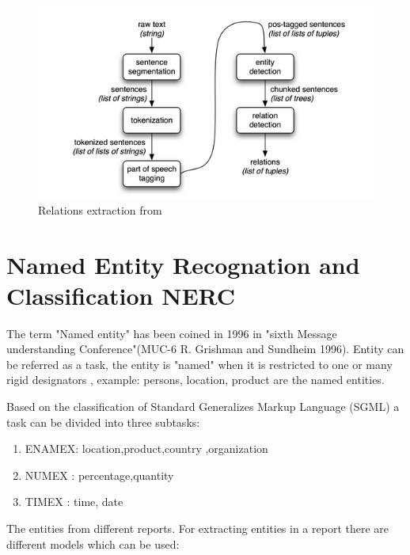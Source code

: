 \begin{figure}[hbtp]
\caption{Relations extraction from }
\centering
\includegraphics[scale=0.7]{images/nltk.png}
\end{figure}



\section{ Named Entity Recognation and Classification  NERC}
The term "Named entity" has been coined in 1996 in "sixth  Message understanding Conference"(MUC-6  R. Grishman and  Sundheim 1996).
Entity can be referred as a task, the entity is "named" when it is restricted to one or many rigid designators \citep{sharnagat2014named}, example: persons, location, product are the named entities.

Based on the classification of Standard Generalizes Markup Language (SGML) a task can be divided into three subtasks:
\begin{enumerate}
\item ENAMEX: location,product,country ,organization
\item NUMEX : percentage,quantity 
\item TIMEX : time, date
\end{enumerate}


The entities from different reports.
For extracting entities in a report there are different models which can be used:

